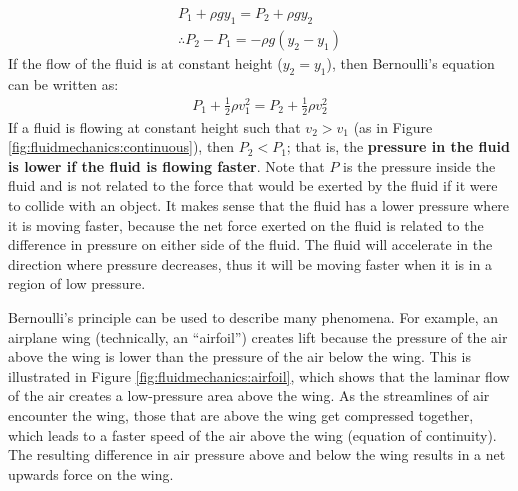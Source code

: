 {{\begin{align*}
P_1 + \rho g y_1= P_2 + \rho g y_2\\
\therefore P_2 - P_1 = - \rho g (y_2 - y_1)
\end{align*}
If the flow of the fluid is at constant height ($y_2=y_1$), then Bernoulli's equation can be written as:
\begin{align*}
P_1 +\frac{1}{2}\rho v_1^2 = P_2 + \frac{1}{2}\rho v_2^2 
\end{align*}
If a fluid is flowing at constant height such that $v_2 > v_1$ (as in Figure \ref{fig:fluidmechanics:continuous}), then $P_2<P_1$; that is, the \textbf{pressure in the fluid is lower if the fluid is flowing faster}. Note that $P$ is the pressure inside the fluid and is not related to the force that would be exerted by the fluid if it were to collide with an object. It makes sense that the fluid has a lower pressure where it is moving faster, because the net force exerted on the fluid is related to the difference in pressure on either side of the fluid. The fluid will accelerate in the direction where pressure decreases, thus it will be moving faster when it is in a region of low pressure.

Bernoulli's principle can be used to describe many phenomena. For example, an airplane wing (technically, an ``airfoil'') creates lift because the pressure of the air above the wing is lower than the pressure of the air below the wing. This is illustrated in Figure \ref{fig:fluidmechanics:airfoil}, which shows that the laminar flow of the air creates a low-pressure area above the wing. As the streamlines of air encounter the wing, those that are above the wing get compressed together, which leads to a faster speed of the air above the wing (equation of continuity). The resulting difference in air pressure above and below the wing results in a net upwards force on the wing. 


}}
